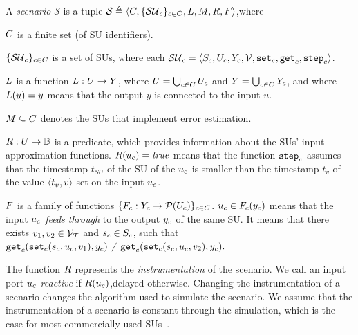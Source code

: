 \begin{definition}[Scenario]\label{def:cosim_scenario}
  A \emph{scenario} $\mathcal{S}$ is a tuple $\mathcal{S} \triangleq  \left\langle C, \{\mathcal{SU}_c\}_{c \in C}, L, M, R, F \right\rangle $,where 
  \begin{compactitem}
    \item $C$ is a finite set (of SU identifiers). 
    \item $\{\mathcal{SU}_c\}_{c \in C}$ is a set of SUs, where each $\mathcal{SU}_c =  \left\langle S_{c}, U_{c}, Y_{c}, \mathcal{V}, \mathtt{set}_{c}, \mathtt{get}_{c}, \mathtt{step}_{c} \right\rangle $.
    \item
    $L$ is a function $L : U \to Y$, where $U = \bigcup_{c \in C} U_{c}$ and $Y = \bigcup_{c \in C} Y_{c}$, and where 
    $L(u)=y$ means that the output $y$ is connected to the input $u$.   
    \item $M \subseteq C$ denotes the SUs that implement error estimation. 
    \item
    $R : U \to \mathbb{B}$ is a predicate, which provides information about the SUs' input approximation functions.
    $R(u_{c}) = \mathit{true}$ means that the function $\mathtt{step}_{c}$ assumes that the timestamp $t_{SU}$ of the SU of the $u_{c}$ is smaller than the timestamp $t_v$ of the value $ \left\langle t_v,v \right\rangle $ set on the input $u_{c}$.
    \item $F$ is a family of functions $\{F_{c} : Y_{c} \to \mathcal{P}(U_{c})\}_{c \in C}$.
    $u_{c} \in F_{c}(y_{c})$ means that the input $u_{c}$ \emph{feeds through} to the output $y_{c}$ of the same SU.
    It means that there exists $v_1, v_2 \in \mathcal{V_{T}}$ and $s_{c} \in S_{c}$, such that
    $\mathtt{get}_{c} (\mathtt{set}_{c}(s_{c}, u_{c}, v_1), y_{c}) \neq \mathtt{get}_{c} (\mathtt{set}_{c}(s_{c}, u_{c}, v_2), y_{c}).$
  \end{compactitem}
\end{definition}

The function $R$ represents the \emph{instrumentation} of the scenario.
We call an input port $u_{c}$ \emph{reactive} if $R(u_{c})$,{delayed} otherwise. 
Changing the instrumentation of a scenario changes the algorithm used to simulate the scenario.
We assume that the instrumentation of a scenario is constant through the simulation, which is the case for most commercially used SUs~\cite{Gomes2018a}.

